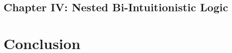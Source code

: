 
\subsection{Chapter IV: Nested Bi-Intuitionistic Logic}
\label{subsec:nested_bi-intuitionistic_logic}


\section{Conclusion}
\label{sec:conclusion}


 

